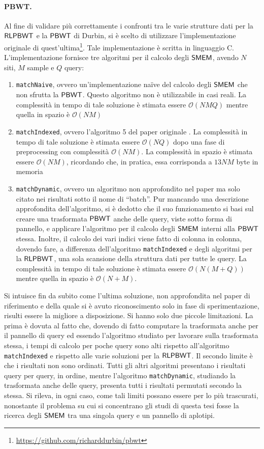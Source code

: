 \paragraph{PBWT.}
Al fine di validare più correttamente i confronti tra le varie strutture dati
per la $\mbox{\rm {\sf RLPBWT}}$ e la $\mbox{\rm {\sf PBWT}}$ di Durbin, si è scelto di utilizzare
l'implementazione originale di
quest'ultima\footnote{\url{https://github.com/richarddurbin/pbwt}}. Tale
implementazione è scritta in 
linguaggio C. L'implementazione
fornisce tre algoritmi per il calcolo degli $\mbox{\rm {\sf SMEM}}$, avendo $N$ siti, $M$ sample
e $Q$ query:
\begin{enumerate}
  \item \texttt{matchNaive}, ovvero un'implementazione na\"{i}ve del calcolo
  degli $\mbox{\rm {\sf SMEM}}$ che non sfrutta la $\mbox{\rm {\sf PBWT}}$. Questo algoritmo non è
  utilizzabile in casi reali. La complessità in tempo di tale 
  soluzione è stimata essere $\mathcal{O}(NMQ)$ mentre quella in spazio è
  $\mathcal{O}(NM)$
  \item \texttt{matchIndexed}, ovvero l'algoritmo 5 del paper originale
  \cite{pbwt}. La complessità in tempo di tale 
  soluzione è stimata essere $\mathcal{O}(NQ)$ dopo una fase di preprocessing
  con complessità $\mathcal{O}(NM)$. La complessità in spazio è stimata essere
  $\mathcal{O}(NM)$, ricordando che, in pratica, essa corrisponda a $13NM$
  byte in memoria
  \item \texttt{matchDynamic}, ovvero un algoritmo non approfondito nel paper ma
  solo citato nei risultati sotto il nome di ``batch''. Pur mancando una
  descrizione approfondita dell'algoritmo, si è dedotto che il suo funzionamento
  si basi sul creare una trasformata $\mbox{\rm {\sf PBWT}}$ anche delle query, viste 
  sotto forma di pannello, e applicare l'algoritmo per il calcolo degli $\mbox{\rm {\sf SMEM}}$
  interni alla $\mbox{\rm {\sf PBWT}}$ stessa. Inoltre, il calcolo dei vari indici viene
  fatto di colonna in colonna, dovendo fare, a differenza dell'algoritmo
  \texttt{matchIndexed} e degli algoritmi per la $\mbox{\rm {\sf RLPBWT}}$, una sola scansione
  della struttura dati per tutte le query. La complessità in tempo di tale 
  soluzione è stimata essere $\mathcal{O}(N(M+Q))$ mentre quella in spazio è
  $\mathcal{O}(N+M)$. 
\end{enumerate}
Si intuisce fin da subito come l'ultima soluzione, non approfondita nel paper di
riferimento e della quale si è avuto riconoscimento solo in fase di
sperimentazione, risulti essere la migliore a disposizione. Si hanno solo due
piccole limitazioni. La prima è dovuta al fatto che, dovendo di fatto computare
la trasformata anche per il pannello di query ed essendo l'algoritmo studiato
per lavorare sulla trasformata stessa, i tempi di calcolo per poche query sono
alti rispetto all'algoritmo \texttt{matchIndexed} e rispetto alle varie
soluzioni per la $\mbox{\rm {\sf RLPBWT}}$. Il secondo limite è che i risultati non sono
ordinati. Tutti gli altri algoritmi presentano i risultati query per query, in
ordine, mentre l'algoritmo \texttt{matchDynamic}, studiando la trasformata anche
delle query,
presenta tutti i risultati permutati secondo la stessa. Si rileva, in ogni caso,
come tali limiti possano essere per lo più trascurati, nonostante il problema su
cui si concentrano gli studi di questa tesi fosse la ricerca degli $\mbox{\rm {\sf SMEM}}$ tra
una 
singola query e un pannello di aplotipi.
